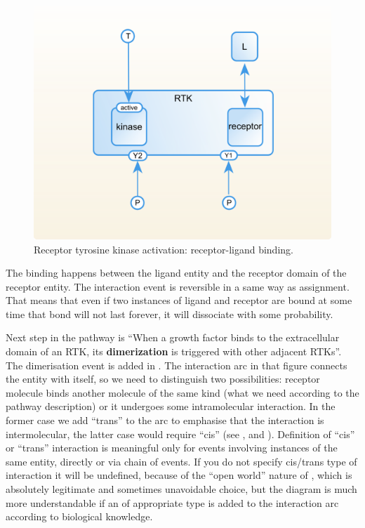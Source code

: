 \begin{figure}[H]
  \centering
  \vspace*{-0.75em}
  \includegraphics[scale=0.75]{examples/rtk-binding.png}
   \caption{Receptor tyrosine kinase activation: receptor-ligand binding.}
  \label{fig:rtk-binding}
\end{figure}

The binding happens between the ligand entity and the receptor domain of the receptor entity. The interaction event is reversible in a same way as assignment. That means that even if two instances of ligand and receptor are bound at some time that bond will not last forever, it will dissociate with some probability.

Next step in the pathway is ``When a growth factor binds to the extracellular domain of an RTK, its \textbf{dimerization} is triggered with other adjacent RTKs''. The dimerisation event is added in . The interaction arc in that figure connects the entity with itself, so we need to distinguish two possibilities: receptor molecule binds another molecule of the same kind (what we need according to the pathway description) or it undergoes some intramolecular interaction. In the former case we add  ``trans'' to the arc to emphasise that the interaction is intermolecular, the latter case would require  ``cis'' (see ,  and ). Definition of ``cis'' or ``trans'' interaction is meaningful only for events involving instances of the same entity, directly or via chain of events. If you do not specify cis/trans type of interaction it will be undefined, because of the ``open world'' nature of \SBGNERLone, which is absolutely legitimate and sometimes unavoidable choice, but the diagram is much more understandable if an  of appropriate type is added to the interaction arc according to biological knowledge.


